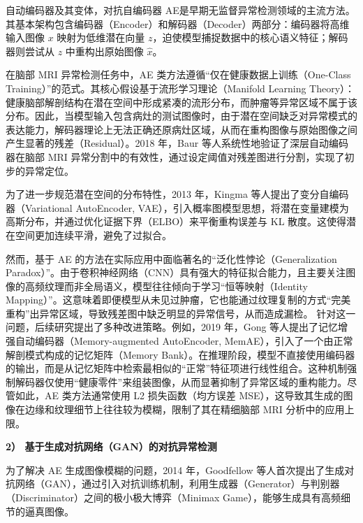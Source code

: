 \documentclass[Win]{xjtuBSThesis}  %
\begin{document}
自动编码器及其变体，对抗自编码器 AE是早期无监督异常检测领域的主流方法。其基本架构包含编码器（Encoder）和解码器（Decoder）两部分：编码器将高维输入图像 $x$ 映射为低维潜在向量 $z$，迫使模型捕捉数据中的核心语义特征；解码器则尝试从 $z$ 中重构出原始图像 $\hat{x}$。

在脑部 MRI 异常检测任务中，AE 类方法遵循“仅在健康数据上训练（One-Class Training）”的范式。其核心假设基于流形学习理论（Manifold Learning Theory）：健康脑部解剖结构在潜在空间中形成紧凑的流形分布，而肿瘤等异常区域不属于该分布。因此，当模型输入包含病灶的测试图像时，由于潜在空间缺乏对异常模式的表达能力，解码器理论上无法正确还原病灶区域，从而在重构图像与原始图像之间产生显著的残差（Residual）。2018 年，Baur 等人系统性地验证了深层自动编码器在脑部 MRI 异常分割中的有效性，通过设定阈值对残差图进行分割，实现了初步的异常定位。

为了进一步规范潜在空间的分布特性，2013 年，Kingma 等人提出了变分自编码器（Variational AutoEncoder, VAE），引入概率图模型思想，将潜在变量建模为高斯分布，并通过优化证据下界（ELBO）来平衡重构误差与 KL 散度。这使得潜在空间更加连续平滑，避免了过拟合。

然而，基于 AE 的方法在实际应用中面临著名的“泛化性悖论（Generalization Paradox）”。由于卷积神经网络（CNN）具有强大的特征拟合能力，且主要关注图像的高频纹理而非全局语义，模型往往倾向于学习“恒等映射（Identity Mapping）”。这意味着即便模型从未见过肿瘤，它也能通过纹理复制的方式“完美重构”出异常区域，导致残差图中缺乏明显的异常信号，从而造成漏检。
针对这一问题，后续研究提出了多种改进策略。例如，2019 年，Gong 等人提出了记忆增强自动编码器（Memory-augmented AutoEncoder, MemAE），引入了一个由正常解剖模式构成的记忆矩阵（Memory Bank）。在推理阶段，模型不直接使用编码器的输出，而是从记忆矩阵中检索最相似的“正常”特征项进行线性组合。这种机制强制解码器仅使用“健康零件”来组装图像，从而显著抑制了异常区域的重构能力。尽管如此，AE 类方法通常使用 L2 损失函数（均方误差 MSE），这导致其生成的图像在边缘和纹理细节上往往较为模糊，限制了其在精细脑部 MRI 分析中的应用上限。

\textbf{2） 基于生成对抗网络（GAN）的对抗异常检测}

为了解决 AE 生成图像模糊的问题，2014 年，Goodfellow 等人首次提出了生成对抗网络（GAN），通过引入对抗训练机制，利用生成器（Generator）与判别器（Discriminator）之间的极小极大博弈（Minimax Game），能够生成具有高频细节的逼真图像。
\end{document}

